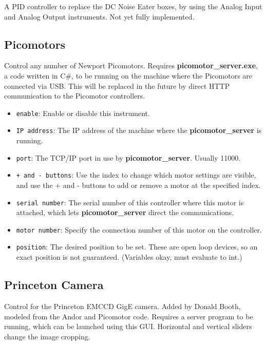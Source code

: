 \documentclass[pdftex,11pt,letterpaper]{article}
\begin{document}
A PID controller to replace the DC Noise Eater boxes, by using the Analog Input and Analog Output instruments.  Not yet fully implemented.

\subsection{Picomotors}

Control any number of Newport Picomotors.  Requires \textbf{picomotor\_server.exe}, a code written in C\#, to be running on the machine where the Picomotors are connected via USB.  This will be replaced in the future by direct HTTP communication to the Picomotor controllers.

\begin{itemize}
\item \texttt{enable}: Enable or disable this instrument.
\item \texttt{IP address}:  The IP address of the machine where the \textbf{picomotor\_server} is running.
\item \texttt{port}:  The TCP/IP port in use by \textbf{picomotor\_server}.  Usually 11000.
\item \texttt{+ and - buttons}:  Use the index to change which motor settings are visible, and use the + and - buttons to add or remove a motor at the specified index.
\item \texttt{serial number}:  The serial number of this controller where this motor is attached, which lets \textbf{picomotor\_server} direct the communications.
\item \texttt{motor number}:  Specify the connection number of this motor on the controller.
\item \texttt{position}:  The desired position to be set.  These are open loop devices, so an exact position is not guaranteed.  (Variables okay, must evaluate to int.)
\end{itemize}

\subsection{Princeton Camera}

Control for the Princeton EMCCD GigE camera.  Added by Donald Booth, modeled from the Andor and Picomotor code.  Requires a server program to be running, which can be launched using this GUI.  Horizontal and vertical sliders change the image cropping.
\end{document}
